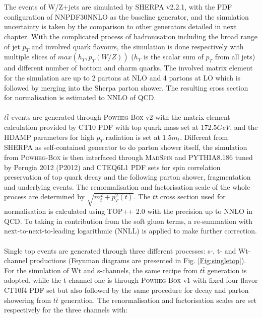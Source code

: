 \\
\\The events of W/Z+jets are simulated by \textsc{SHERPA} v2.2.1, with the PDF configuration of \textsc{NNPDF30NNLO} as the baseline generator, and the simulation uncertainty is taken by the comparison to other generators detailed in next chapter. With the complicated process of hadronisation including the broad range of jet $p_{T}$ and involved quark flavours, the simulation is done respectively with multiple slices of $max(h_{T}, p_{T}(W/Z))$ ($h_{T}$ is the scalar sum of $p_{T}$ from all jets) and different number of bottom and charm quarks. The involved matrix element for the simulation are up to 2 partons at NLO and 4 partons at LO which is followed by merging into the Sherpa parton shower. The resulting cross section for normalisation is estimated to NNLO of QCD.
\\
\\$t\bar{t}$ events are generated through \textsc{Powheg-Box} v2 with the matrix element calculation provided by \textsc{CT10 PDF} with top quark mass set at $172.5GeV$, and the \textsc{HDAMP} parameters for high $p_{T}$ radiation is set at $1.5m_{t}$. Different from \textsc{SHERPA} as self-contained generator to do parton shower itself, the simulation from \textsc{Powheg-Box} is then interfaced through \textsc{MadSpin} and \textsc{PYTHIA}8.186 tuned by Perugia 2012 (P2012) and \textsc{CTEQ6L1 PDF} sets for spin correlation preservation of top quark decay and the following parton shower, fragmentation and underlying events. The renormalisation and factorisation scale of the whole process are determined by $\sqrt{m_{t}^2+p^2_{T}(t)}$. The $t\bar{t}$ cross section used for normalisation is calculated using \textsc{TOP++} 2.0 with the precision up to NNLO in QCD. To taking in contribution from the soft gluon terms, a re-summation with next-to-next-to-leading logarithmic (NNLL) is applied to make further correction.  
\\
\\Single top events are generated through three different processes: s-, t- and Wt-channel productions (Feynman diagrams are presented in Fig. \ref{Fig:singletop}). For the simulation of Wt and s-channels, the same recipe from $t\bar{t}$ generation is adopted, while the t-channel one is through \textsc{Powheg-Box} v1 with fixed four-flavor CT10f4 PDF set but also followed by the same procedure for decay and parton showering from $t\bar{t}$ generation. The renormalisation and factorisation scales are set respectively for the three channels with:
